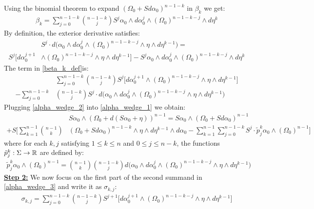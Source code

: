 \documentclass[11pt]{amsart}
\theoremstyle{plain}
\theoremstyle{definition}
\theoremstyle{remark}
\begin{document}
Using the binomial theorem to expand $(\Omega_0 +Sd\alpha_0)^{n-1-k}$ in $\beta_k$ we get:
\begin{align}\label{beta_k_def}
     \beta_k =  \sum^{n-1-k}_{j=0} \binom{n-1-k}{j} S^j \alpha_0 \wedge d\alpha^j_0 \wedge (\Omega_0)^{n-1-k-j} \wedge d\eta^k 
\end{align}
By definition, the exterior derivative satisfies:
\begin{align}
    &S^j \cdot d\big(\alpha_0 \wedge d\alpha^j_0 \wedge (\Omega_0)^{n-1-k-j}\wedge \eta \wedge d\eta^{k-1}\big) = \\\nonumber S^j \big[ d\alpha^{j+1}_0  &\wedge (\Omega_0)^{n-1-k-j} \wedge \eta \wedge d\eta^{k-1}\big] - S^j \alpha_0 \wedge d\alpha^j_0 \wedge (\Omega_0)^{n-1-k-j} \wedge d\eta^k 
\end{align}
The term in \eqref{beta_k_def}is:
\begin{align}\label{alpha_wedge_2}
 &\sum^{n-1-k}_{j=0}   \binom{n-1-k}{j}  S^j \big[ d\alpha^{j+1}_0  \wedge (\Omega_0)^{n-1-k-j} \wedge \eta \wedge d\eta^{k-1}\big] \\\nonumber -    \sum^{n-1-k}_{j=0} & \binom{n-1-k}{j}  S^j \cdot d\big(\alpha_0 \wedge d\alpha^j_0 \wedge (\Omega_0)^{n-1-k-j}\wedge \eta \wedge d\eta^{k-1}\big)  
\end{align}
Plugging \eqref{alpha_wedge_2} into \eqref{alpha_wedge_1} we obtain:
\begin{align}\label{alpha_wedge_3}
  &S\alpha_0 \wedge (\Omega_0 +  d(S\alpha_0 + \eta))^{n-1} =   S\alpha_0 \wedge (\Omega_0 +Sd\alpha_0)^{n-1} \\\nonumber + S \Bigg[ \sum_{k=1}^{n-1} \binom{n-1}{k}  &(\Omega_0 + Sd\alpha_0)^{n-1-k} \wedge \eta \wedge d\eta^{k-1} \wedge d\alpha_0  - \sum^{n-1}_{k=1}  \sum^{n-1-k}_{j=0} S^j \cdot \tilde{p}^k_j \alpha_0 \wedge (\Omega_0)^{n-1} \Bigg]
\end{align}
where for each $k,j$ satisfying $1\leq k \leq n$ and $0 \leq j \leq n-k$, the functions $\Tilde{p}^k_j: \Sigma \rightarrow \mathbb{R}$ are defined by:
\begin{align}\label{def_of_p_tilde}
    \tilde{p}^k_j \alpha_0 \wedge (\Omega_0)^{n-1} = \binom{n-1}{k} \binom{n-1-k}{j} d\big(\alpha_0 \wedge d\alpha^j_0 \wedge (\Omega_0)^{n-1-k-j}\wedge \eta \wedge d\eta^{k-1}\big)
\end{align}
\textbf{\underline{Step 2:}} We now focus on the first part of the second summand in \eqref{alpha_wedge_3} and write it as $\sigma_{k,j}$:
\begin{align}
    \sigma_{k,j} =  \sum^{n-1-k}_{j=0} \binom{n-1-k}{j} S^{j+1} \big[ d\alpha^{j+1}_0  \wedge (\Omega_0)^{n-1-k-j} \wedge \eta \wedge d\eta^{k-1}\big] 
\end{align}
\end{document}
